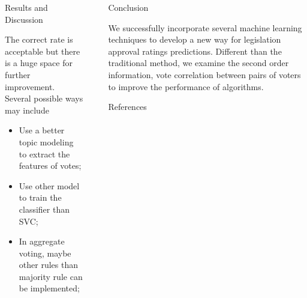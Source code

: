\documentclass[final]{beamer}
\newlength{\sepwid}
\newlength{\onecolwid}
\begin{document}
\begin{frame}[t]
\begin{columns}[t]
\begin{column}{\onecolwid}
\begin{block}{Results and Discussion}
    
    The correct rate is acceptable but there is a huge space for further improvement. Several possible ways may include
    \begin{itemize}
        \item Use a better topic modeling to extract the features of votes;
        \item Use other model to train the classifier than SVC;
        \item In aggregate voting, maybe other rules than majority rule can be implemented;
    \end{itemize}

\end{block}




\end{column} %

\begin{column}{\sepwid}\end{column} %

\begin{column}{\onecolwid} %


\begin{block}{Conclusion}

We successfully incorporate several machine learning techniques to develop a new way for legislation approval ratings predictions. Different than the traditional method, we examine the second order information, vote correlation between pairs of voters to improve the performance of algorithms.  

\end{block}


\begin{block}{References}

\nocite{*} %
\small{
\vspace{0.75in}}


\end{block}
\end{column}
\end{columns}
\end{frame}
\end{document}
